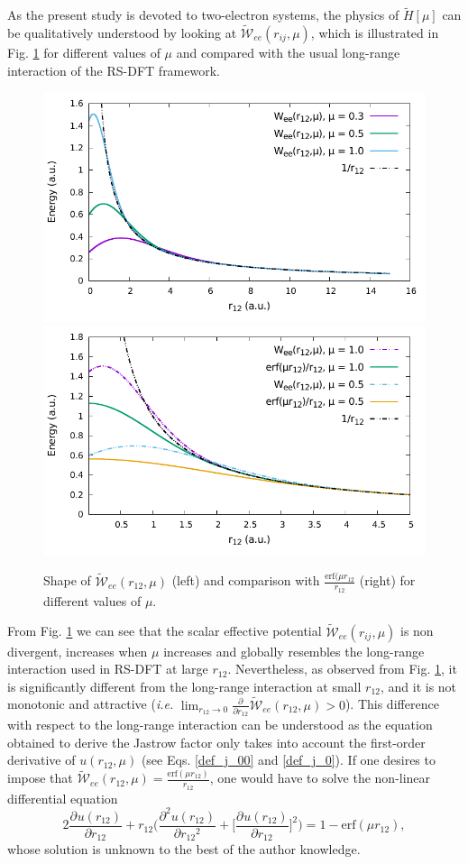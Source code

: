 \documentclass[aip,jcp,reprint,noshowkeys,superscriptaddress,twocolumn]{revtex4-1}
\newcommand{\deriv}[3]{\frac{\partial^{#3} #1}{\partial {#2}^{#3}}}
\begin{document}
As the present study is devoted to two-electron systems, the physics of $\tilde{H}[\mu]$ can be qualitatively understood by looking at $\tilde{\mathcal{W}}_{ee}(r_{ij},\mu)$, which is illustrated in Fig. \ref{fig_wee_mu} for different values of $\mu$ and compared with the usual long-range interaction of the RS-DFT framework. 
\begin{figure}
        \includegraphics[width=0.45\linewidth]{plots/jastrow/w_ee_small.pdf}
        \includegraphics[width=0.45\linewidth]{plots/jastrow/w_ee_erf.pdf}\\
        \caption{Shape of $\tilde{\mathcal{W}}_{ee}(r_{12},\mu)$ (left) and comparison with $\frac{\text{erf}(\mu r_{12}}{r_{12}}$ (right) for different values of $\mu$.}
 \label{fig_wee_mu}
\end{figure}
From  Fig. \ref{fig_wee_mu} we can see that the scalar effective potential $ \tilde{\mathcal{W}}_{ee}(r_{ij},\mu)$ 
is non divergent, increases when $\mu$ increases and globally resembles the long-range interaction used in RS-DFT at large $r_{12}$. 
Nevertheless, as observed from Fig. \ref{fig_wee_mu}, it is significantly different 
from the long-range interaction at small $r_{12}$, 
and it is not monotonic and attractive (\textit{i.e.} $\lim_{r_{12} \rightarrow 0} \deriv{}{r_{12}}{} \tilde{\mathcal{W}}_{ee}(r_{12},\mu) >0 $). 
This difference with respect to the long-range interaction can be understood as the equation obtained to derive the Jastrow factor only takes into account the first-order derivative of $u(r_{12},\mu)$ (see Eqs. \eqref{def_j_00} and \eqref{def_j_0}). 
If one desires to impose that $\tilde{\mathcal{W}}_{ee}(r_{12},\mu) = \frac{\text{erf}(\mu r_{12})}{r_{12}}$, one would have to solve the non-linear differential equation 
\begin{equation}
 2 \deriv{u(r_{12})}{r_{12}}{} + r_{12} \bigg( \deriv{u(r_{12})}{r_{12}}{2} + \bigg[ \deriv{u(r_{12})}{r_{12}}{} \bigg]^2\bigg) = 1 - \text{erf}(\mu r_{12}), 
\end{equation}
whose solution is unknown to the best of the author knowledge. 
\end{document}
